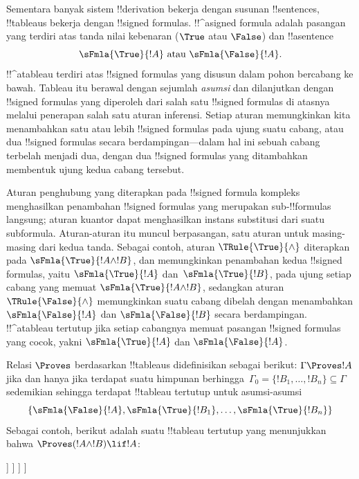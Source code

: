 \documentclass[../../../include/open-logic-section]{subfiles}
\begin{document}
      {}
      {}


Sementara banyak sistem !!{derivation} bekerja dengan susunan
!!{sentence}s, !!{tableau}s bekerja dengan !!{signed formula}s.
!!^a{signed formula} adalah pasangan yang terdiri atas tanda nilai
kebenaran ($\True$ atau $\False$) dan !!a{sentence}
\[
\sFmla{\True}{!A} \text{ atau } \sFmla{\False}{!A}.
\]
!!^a{tableau} terdiri atas !!{signed formula}s yang disusun dalam
pohon bercabang ke bawah. Tableau itu berawal dengan sejumlah
\emph{asumsi} dan dilanjutkan dengan !!{signed formula}s yang diperoleh
dari salah satu !!{signed formula}s di atasnya melalui penerapan salah
satu aturan inferensi. Setiap aturan memungkinkan kita menambahkan
satu atau lebih !!{signed formula}s pada ujung suatu cabang, atau dua
!!{signed formula}s secara berdampingan---dalam hal ini sebuah cabang
terbelah menjadi dua, dengan dua !!{signed
  formula}s yang ditambahkan membentuk ujung kedua cabang tersebut.

Aturan penghubung yang diterapkan pada !!{signed formula} kompleks
menghasilkan penambahan !!{signed formula}s yang merupakan
sub-!!{formula}s langsung; aturan kuantor dapat menghasilkan instans
substitusi dari suatu subformula. Aturan-aturan itu muncul berpasangan,
satu aturan untuk masing-masing dari kedua tanda. Sebagai contoh, aturan
$\TRule{\True}{\land}$ diterapkan pada $\sFmla{\True}{!A \land !B}$,
dan memungkinkan penambahan kedua !!{signed formula}s, yaitu
$\sFmla{\True}{!A}$ dan~$\sFmla{\True}{!B}$, pada ujung setiap cabang
yang memuat $\sFmla{\True}{!A \land !B}$, sedangkan aturan
$\TRule{\False}{\land}$ memungkinkan suatu cabang dibelah dengan
menambahkan $\sFmla{\False}{!A}$ dan $\sFmla{\False}{!B}$ secara
berdampingan. !!^a{tableau} tertutup jika setiap cabangnya memuat
pasangan !!{signed formula}s yang cocok, yakni
$\sFmla{\True}{!A}$ dan $\sFmla{\False}{!A}$.

Relasi $\Proves$ berdasarkan !!{tableau}s didefinisikan sebagai
berikut: $\Gamma \Proves !A$ jika dan hanya jika terdapat suatu
himpunan berhingga~$\Gamma_0 = \{!B_1, \dots, !B_n\} \subseteq \Gamma$
sedemikian sehingga terdapat !!{tableau} tertutup untuk asumsi-asumsi
\[
\{\sFmla{\False}{!A}, \sFmla{\True}{!B_1}, \dots, \sFmla{\True}{!B_n}\}
\]
Sebagai contoh, berikut adalah suatu !!{tableau} tertutup yang menunjukkan
bahwa $\Proves (!A \land !B) \lif !A$:
\begin{oltableau}
  [\sFmla{\False}{(\formula{A} \land \formula{B}) \lif \formula{A}}, just = \TAss
    [\sFmla{\True}{\formula{A} \land \formula{B}}, just = {\TRule{\False}{\lif}[1]}
      [\sFmla{\False}{\formula{A}}, just = {\TRule{\False}{\lif}[1]}
        [\sFmla{\True}{\formula{A}}, just = {\TRule{\True}{\land}[2]}
          [\sFmla{\True}{\formula{B}}, just = {\TRule{\True}{\land}[2]}, close]
        ]
      ]
    ]
  ]
\end{oltableau}
\end{document}
